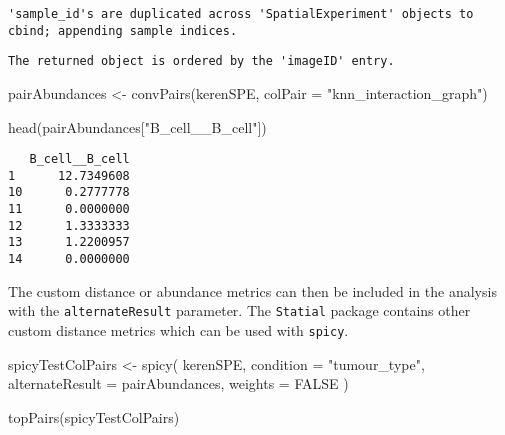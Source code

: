 \documentclass[
  letterpaper,
  DIV=11,
  numbers=noendperiod]{scrreprt}
\newenvironment{Shaded}{\begin{snugshade}}{\end{snugshade}}
\newcommand{\AttributeTok}[1]{\textcolor[rgb]{0.40,0.45,0.13}{#1}}
\newcommand{\ConstantTok}[1]{\textcolor[rgb]{0.56,0.35,0.01}{#1}}
\newcommand{\FunctionTok}[1]{\textcolor[rgb]{0.28,0.35,0.67}{#1}}
\newcommand{\NormalTok}[1]{\textcolor[rgb]{0.00,0.23,0.31}{#1}}
\newcommand{\OtherTok}[1]{\textcolor[rgb]{0.00,0.23,0.31}{#1}}
\newcommand{\StringTok}[1]{\textcolor[rgb]{0.13,0.47,0.30}{#1}}
\begin{document}
\begin{verbatim}
'sample_id's are duplicated across 'SpatialExperiment' objects to cbind; appending sample indices.
\end{verbatim}

\begin{verbatim}
The returned object is ordered by the 'imageID' entry.
\end{verbatim}

\begin{Shaded}
\begin{Highlighting}[]
\NormalTok{pairAbundances }\OtherTok{\textless{}{-}} \FunctionTok{convPairs}\NormalTok{(kerenSPE,}
                  \AttributeTok{colPair =} \StringTok{"knn\_interaction\_graph"}\NormalTok{)}

\FunctionTok{head}\NormalTok{(pairAbundances[}\StringTok{"B\_cell\_\_B\_cell"}\NormalTok{])}
\end{Highlighting}
\end{Shaded}

\begin{verbatim}
   B_cell__B_cell
1      12.7349608
10      0.2777778
11      0.0000000
12      1.3333333
13      1.2200957
14      0.0000000
\end{verbatim}

The custom distance or abundance metrics can then be included in the
analysis with the \texttt{alternateResult} parameter. The
\texttt{Statial} package contains other custom distance metrics which
can be used with \texttt{spicy}.

\begin{Shaded}
\begin{Highlighting}[]
\NormalTok{spicyTestColPairs }\OtherTok{\textless{}{-}} \FunctionTok{spicy}\NormalTok{(}
\NormalTok{  kerenSPE,}
  \AttributeTok{condition =} \StringTok{"tumour\_type"}\NormalTok{,}
  \AttributeTok{alternateResult =}\NormalTok{ pairAbundances,}
  \AttributeTok{weights =} \ConstantTok{FALSE}
\NormalTok{)}

\FunctionTok{topPairs}\NormalTok{(spicyTestColPairs)}
\end{Highlighting}
\end{Shaded}
\end{document}
